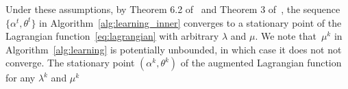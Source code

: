Under these assumptions, by Theorem 6.2 of~\cite{Davis} and Theorem 3 of~\cite{path-diff},
the sequence $\{\alpha^{t},\theta^{t}\}$ in Algorithm~\ref{alg:learning_inner} converges to a stationary point of the Lagrangian function~\eqref{eq:lagrangian} with arbitrary $\lambda$ and $\mu$.
We note that~$\mu^k$ in Algorithm~\ref{alg:learning} is potentially unbounded, in which case it does not not converge.
The stationary point $(\alpha^{k},\theta^{k})$ of the augmented Lagrangian function for any $\lambda^k$ and $\mu^k$ 
